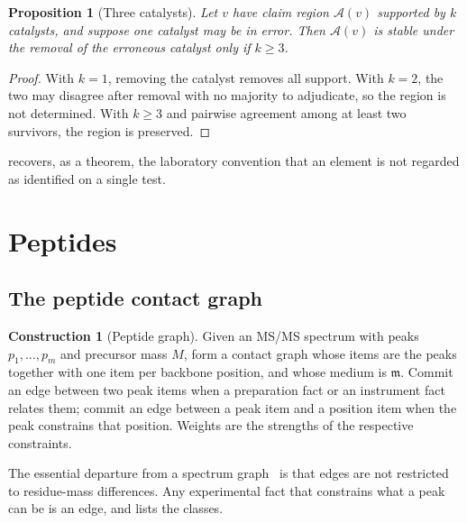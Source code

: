 \documentclass[11pt,a4paper]{article}
\newtheorem{proposition}[theorem]{Proposition}
\theoremstyle{definition}
\newtheorem{construction}[theorem]{Construction}
\theoremstyle{remark}
\newcommand{\med}{\mathfrak{m}}              %
\newcommand{\amb}{\mathcal{A}}               %
\begin{document}
\begin{proposition}[Three catalysts]
\label{prop:three}
Let $v$ have claim region $\amb(v)$ supported by $k$ catalysts, and
suppose one catalyst may be in error. Then $\amb(v)$ is stable under the
removal of the erroneous catalyst only if $k\ge3$.
\end{proposition}

\begin{proof}
With $k=1$, removing the catalyst removes all support. With $k=2$, the
two may disagree after removal with no majority to adjudicate, so the
region is not determined. With $k\ge3$ and pairwise agreement among at
least two survivors, the region is preserved.
\end{proof}

 recovers, as a theorem, the laboratory convention that
an element is not regarded as identified on a single test.

\section{Peptides}
\label{sec:peptide}

\subsection{The peptide contact graph}

\begin{construction}[Peptide graph]
\label{con:peptide}
Given an MS/MS spectrum with peaks $p_1,\dots,p_m$ and precursor mass
$M$, form a contact graph whose items are the peaks together with one
item per backbone position, and whose medium is $\med$. Commit an edge
between two peak items when a preparation fact or an instrument fact
relates them; commit an edge between a peak item and a position item
when the peak constrains that position. Weights are the strengths of the
respective constraints.
\end{construction}

The essential departure from a spectrum
graph~\citep{dancik1999novo} is that edges are not restricted to
residue-mass differences. Any experimental fact that constrains what a
peak can be is an edge, and  lists the classes.
\end{document}

